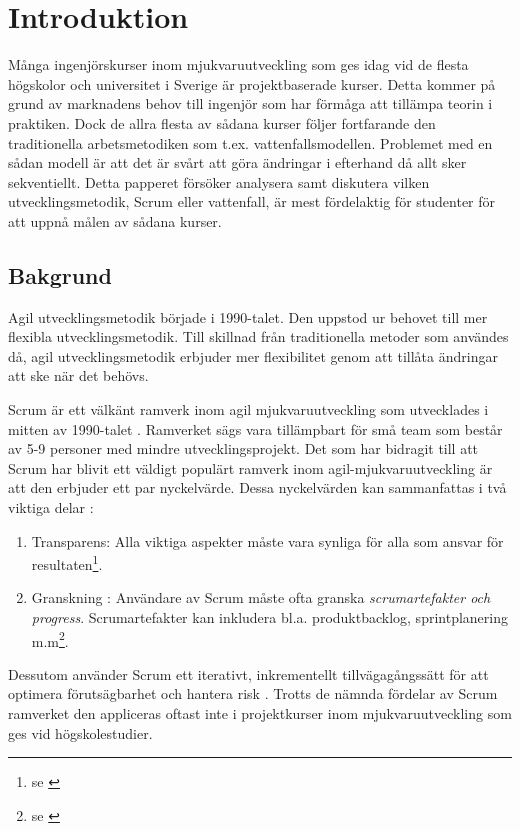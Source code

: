\section{Introduktion}
\label{sec:Lieth_Wahid-introduction}
Många ingenjörskurser inom mjukvaruutveckling som ges idag vid de flesta högskolor och universitet i Sverige är projektbaserade
 kurser. Detta kommer på grund av marknadens behov till ingenjör som har förmåga att tillämpa teorin i praktiken. Dock de allra flesta av sådana 
 kurser följer fortfarande den traditionella arbetsmetodiken som t.ex. vattenfallsmodellen. Problemet med en sådan modell är att 
 det är svårt att göra ändringar i efterhand då allt sker sekventiellt. Detta papperet försöker analysera samt diskutera vilken utvecklingsmetodik, Scrum eller vattenfall, är mest fördelaktig för studenter för att uppnå målen av sådana kurser.
 
\subsection{Bakgrund}
Agil utvecklingsmetodik började i 1990-talet. Den uppstod ur behovet till mer flexibla utvecklingsmetodik. Till skillnad 
från traditionella metoder som användes då, agil utvecklingsmetodik erbjuder mer flexibilitet genom att tillåta ändringar att ske när 
det behövs.

Scrum är ett välkänt ramverk inom agil mjukvaruutveckling som utvecklades i mitten av 1990-talet \cite{TheScrum6:online}. 
Ramverket sägs vara tillämpbart för små team som består av 5-9 personer med mindre utvecklingsprojekt. Det som har bidragit
till att Scrum har blivit ett väldigt populärt ramverk inom agil-mjukvaruutveckling är att den erbjuder ett par nyckelvärde. Dessa 
nyckelvärden kan sammanfattas i två viktiga delar \cite{TheScrum6:online} : 
\begin{enumerate}\label{two}
	\item Transparens: Alla viktiga aspekter måste vara synliga för alla som ansvar för resultaten\footnote{se  \cite{TheScrum6:online,}}.
	\item Granskning : Användare av Scrum måste ofta granska \textit{scrumartefakter och progress}. Scrumartefakter kan inkludera
	 bl.a. produktbacklog, sprintplanering m.m\footnote{se  \cite{TheScrum6:online,}}.
\end{enumerate} 
Dessutom använder Scrum ett iterativt, inkrementellt tillvägagångssätt för att optimera förutsägbarhet och hantera risk \cite{TheScrum6:online,}. Trotts
de nämnda fördelar av Scrum ramverket den appliceras oftast inte i projektkurser inom mjukvaruutveckling som ges vid högskolestudier. 

